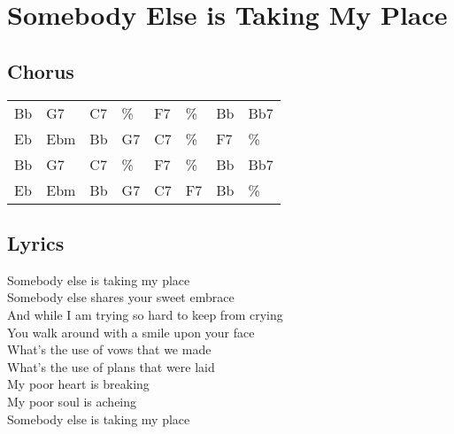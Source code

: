 \section{Somebody Else is Taking My Place}


\subsection*{Chorus}


\begin{tabular}{l l l l l l l l}
Bb & G7 & C7 & \% & F7 & \% & Bb & Bb7 \\ 
Eb & Ebm & Bb & G7 & C7 & \% & F7 & \% \\ 
Bb & G7 & C7 & \% & F7 & \% & Bb & Bb7 \\ 
Eb & Ebm & Bb & G7 & C7 & F7 & Bb & \% \\ 
\end{tabular}


\subsection*{Lyrics}


Somebody else is taking my place \\ 
Somebody else shares your sweet embrace \\ 
And while I am trying so hard to keep from crying \\ 
You walk around with a smile upon your face \\ 

What's the use of vows that we made \\ 
What's the use of plans that were laid \\ 

My poor heart is breaking \\ 
My poor soul is acheing \\ 
Somebody else is taking my place \\ 
